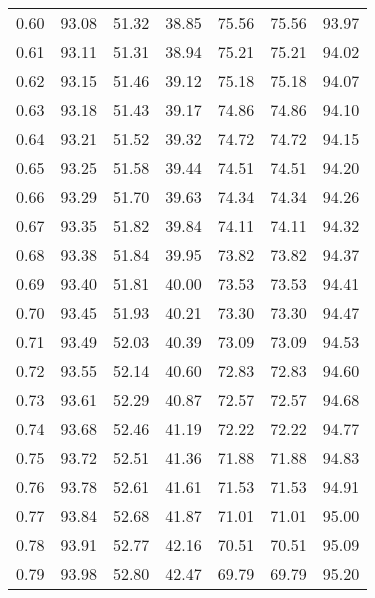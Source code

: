 \begin{tabular}{|c|c|c|c|c|c|c|}
      0.60 &     93.08 &     51.32 &      38.85 &   75.56 &      75.56 &         93.97 \\
      0.61 &     93.11 &     51.31 &      38.94 &   75.21 &      75.21 &         94.02 \\
      0.62 &     93.15 &     51.46 &      39.12 &   75.18 &      75.18 &         94.07 \\
      0.63 &     93.18 &     51.43 &      39.17 &   74.86 &      74.86 &         94.10 \\
      0.64 &     93.21 &     51.52 &      39.32 &   74.72 &      74.72 &         94.15 \\
      0.65 &     93.25 &     51.58 &      39.44 &   74.51 &      74.51 &         94.20 \\
      0.66 &     93.29 &     51.70 &      39.63 &   74.34 &      74.34 &         94.26 \\
      0.67 &     93.35 &     51.82 &      39.84 &   74.11 &      74.11 &         94.32 \\
      0.68 &     93.38 &     51.84 &      39.95 &   73.82 &      73.82 &         94.37 \\
      0.69 &     93.40 &     51.81 &      40.00 &   73.53 &      73.53 &         94.41 \\
      0.70 &     93.45 &     51.93 &      40.21 &   73.30 &      73.30 &         94.47 \\
      0.71 &     93.49 &     52.03 &      40.39 &   73.09 &      73.09 &         94.53 \\
      0.72 &     93.55 &     52.14 &      40.60 &   72.83 &      72.83 &         94.60 \\
      0.73 &     93.61 &     52.29 &      40.87 &   72.57 &      72.57 &         94.68 \\
      0.74 &     93.68 &     52.46 &      41.19 &   72.22 &      72.22 &         94.77 \\
      0.75 &     93.72 &     52.51 &      41.36 &   71.88 &      71.88 &         94.83 \\
      0.76 &     93.78 &     52.61 &      41.61 &   71.53 &      71.53 &         94.91 \\
      0.77 &     93.84 &     52.68 &      41.87 &   71.01 &      71.01 &         95.00 \\
      0.78 &     93.91 &     52.77 &      42.16 &   70.51 &      70.51 &         95.09 \\
      0.79 &     93.98 &     52.80 &      42.47 &   69.79 &      69.79 &         95.20 \\

\end{tabular}
